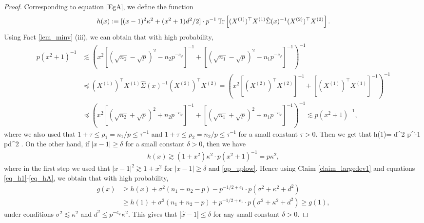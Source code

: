 \begin{proof}
Corresponding to equation \eqref{EgA}, we define the function
\begin{align*}
h(x):= [(x-1)^2\kappa^2 + (x^2+1)d^2/2] \cdot p^{-1} \operatorname{Tr}\left[ (X^{(1)})^\top X^{(1)} \hat\Sigma(x)^{-1}(X^{(2)})^\top X^{(2)}\right].
\end{align*}
Using Fact \ref{lem_minv} (iii), we can obtain that with high probability,
\begin{align}
p(x^2+1)^{-1}&\lesssim \left( x^2 \left[(\sqrt{n_2}-\sqrt{p})^{2}-n_2p^{-c_\varphi}\right]^{-1} +\left[(\sqrt{n_1}-\sqrt{p})^{2}-n_1p^{-c_\varphi}\right]^{-1} \right)^{-1} \nonumber\\
&\preceq (X^{(1)})^\top X^{(1)} \hat\Sigma(x)^{-1}(X^{(2)})^\top X^{(2)} =\left( x^2 [(X^{(2)})^\top X^{(2)}]^{-1} + [(X^{(1)})^\top X^{(1)}]^{-1} \right)^{-1} \nonumber\\
&\preceq \left( x^2 \left[(\sqrt{n_2}+\sqrt{p})^{2}+n_2p^{-c_\varphi}\right]^{-1} +\left[(\sqrt{n_1}+\sqrt{p})^{2}+n_1p^{-c_\varphi}\right]^{-1} \right)^{-1}\lesssim p(x^2+1)^{-1}, \label{op_uplow}
\end{align}
where we also used that $1+\tau\le \rho_1=n_1/p \le \tau^{-1}$ and $1+\tau\le \rho_2=n_2/p \le \tau^{-1}$ for a small constant $\tau>0$. Then we get that
\be\label{eq_h1}h(1)= d^2 \cdot p^{-1} \tr{}\lesssim pd^2 .\ee
On the other hand, if $|x-1|\ge \delta$ for a small constant $\delta>0$, then we have
\begin{align}\label{eq_hA}
h(x)\gtrsim (1+x^2)\kappa^2 \cdot p\left( x^2 +1\right)^{-1} =p\kappa^2 ,
\end{align}
where in the first step we used that $|x-1|^2\gtrsim 1+x^2$ for $|x-1|\ge \delta$ and \eqref{op_uplow}.
Hence using Claim \ref{claim_largedev1} and equations \eqref{eq_h1}-\eqref{eq_hA}, we obtain that with high probability,
\begin{align}
g(x)&\ge  h(x) +\sigma^2(n_1+n_2-p) -p^{-1/2+e_1}\cdot p\left(\sigma^2 +\kappa^2+d^2 \right) \nonumber\\
&\ge h(1) +\sigma^2(n_1+n_2-p) + p^{-1/2+e_1}\cdot p\left(\sigma^2 +\kappa^2+d^2 \right) \ge g(1), \label{gA>g1}
\end{align}
under conditions $\sigma^2 \lesssim  \kappa^2$ and $d^2 \le p^{-c_{\varphi}}{\kappa^2}$. %
This gives that
$|\hat x-1|\le \delta$ for any small constant $\delta>0$.





\end{proof}
